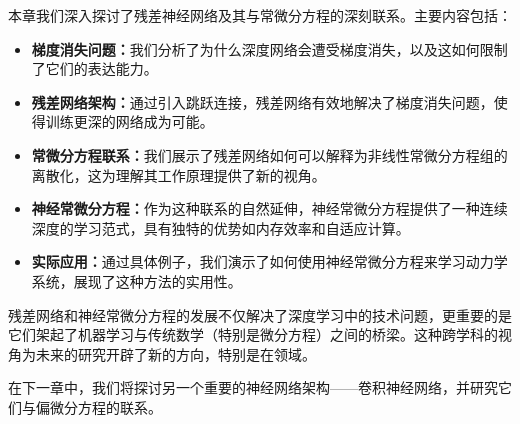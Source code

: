 本章我们深入探讨了残差神经网络及其与常微分方程的深刻联系。主要内容包括：

\begin{itemize}
\item \textbf{梯度消失问题：}我们分析了为什么深度网络会遭受梯度消失，以及这如何限制了它们的表达能力。

\item \textbf{残差网络架构：}通过引入跳跃连接，残差网络有效地解决了梯度消失问题，使得训练更深的网络成为可能。

\item \textbf{常微分方程联系：}我们展示了残差网络如何可以解释为非线性常微分方程组的离散化，这为理解其工作原理提供了新的视角。

\item \textbf{神经常微分方程：}作为这种联系的自然延伸，神经常微分方程提供了一种连续深度的学习范式，具有独特的优势如内存效率和自适应计算。

\item \textbf{实际应用：}通过具体例子，我们演示了如何使用神经常微分方程来学习动力学系统，展现了这种方法的实用性。
\end{itemize}

残差网络和神经常微分方程的发展不仅解决了深度学习中的技术问题，更重要的是它们架起了机器学习与传统数学（特别是微分方程）之间的桥梁。这种跨学科的视角为未来的研究开辟了新的方向，特别是在领域。

在下一章中，我们将探讨另一个重要的神经网络架构——卷积神经网络，并研究它们与偏微分方程的联系。

\newpage